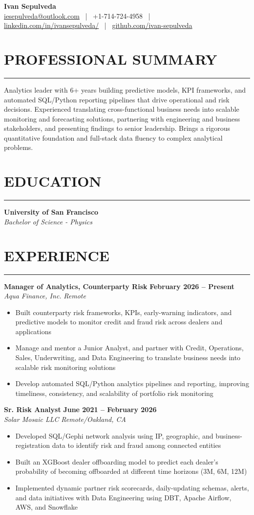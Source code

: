 \documentclass[10.5pt,letterpaper]{article}
\newcommand{\ressection}[1]{%
	\vspace{1.5mm}
	\section*{#1}
	\vspace{0.5mm}
	\hrule
	\vspace{1mm}
}
\newenvironment{myitemize}
{ \begin{itemize}[label={\textbullet}, leftmargin=*, topsep=1pt, partopsep=0pt, itemsep=1pt, parsep=0pt] }
	{ \end{itemize}                  }
\begin{document}
\begin{center}
	{\LARGE \textbf{Ivan Sepulveda}}\\[3pt]
	\href{mailto:iesepulveda@outlook.com}{iesepulveda@outlook.com} ~|~ +1-714-724-4958 ~|~ \href{https://www.linkedin.com/in/ivansepulveda/}{linkedin.com/in/ivansepulveda/} ~|~ \href{https://github.com/ivan-sepulveda}{github.com/ivan-sepulveda}
\end{center}

\ressection{PROFESSIONAL SUMMARY}
Analytics leader with 6+ years building predictive models, KPI frameworks, and automated SQL/Python reporting pipelines that drive operational and risk decisions. Experienced translating cross-functional business needs into scalable monitoring and forecasting solutions, partnering with engineering and business stakeholders, and presenting findings to senior leadership. Brings a rigorous quantitative foundation and full-stack data fluency to complex analytical problems.

\ressection{EDUCATION}
\noindent\textbf{University of San Francisco} \\
\textit{Bachelor of Science - Physics}

\ressection{EXPERIENCE}

\noindent\textbf{Manager of Analytics, Counterparty Risk} \hfill \textbf{February 2026 -- Present} \\
\textit{Aqua Finance, Inc.} \hfill \textit{Remote}
\begin{myitemize}
	\item Built counterparty risk frameworks, KPIs, early-warning indicators, and predictive models to monitor credit and fraud risk across dealers and applications
	\item Manage and mentor a Junior Analyst, and partner with Credit, Operations, Sales, Underwriting, and Data Engineering to translate business needs into scalable risk monitoring solutions
	\item Develop automated SQL/Python analytics pipelines and reporting, improving timeliness, consistency, and scalability of portfolio risk monitoring
\end{myitemize}

\noindent\textbf{Sr. Risk Analyst} \hfill \textbf{June 2021 -- February 2026} \\
\textit{Solar Mosaic LLC} \hfill \textit{Remote/Oakland, CA}
\begin{myitemize}
	\item Developed SQL/Gephi network analysis using IP, geographic, and business-registration data to identify risk and fraud among connected entities
	\item Built an XGBoost dealer offboarding model to predict each dealer's probability of becoming offboarded at different time horizons (3M, 6M, 12M)
	\item Implemented dynamic partner risk scorecards, daily-updating schemas, alerts, and data initiatives with Data Engineering using DBT, Apache Airflow, AWS, and Snowflake
\end{myitemize}
\end{document}
